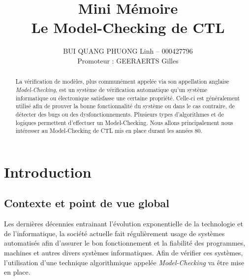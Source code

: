 \documentclass[runningheads,a4paper,10pt]{llncs}
\begin{document}
\mainmatter 

\title{Mini Mémoire \\ Le Model-Checking de CTL}


\author{BUI QUANG PHUONG Linh -- 000427796 \\ Promoteur : GEERAERTS Gilles}



\tocauthor{{}}

\maketitle


\begin{abstract}
La vérification de modèles, plus communément appelée via son appellation anglaise \textit{Model-Checking}, est un système de vérification automatique qu'un système informatique ou électronique satisfasse une certaine propriété. Celle-ci est généralement utilisé afin de prouver la bonne fonctionnalité du système ou dans le cas contraire, de détecter des bugs ou des dysfonctionnements. Plusieurs types d'algorithmes et de logiques permettent d'effectuer un Model-Checking. Nous allons principalement nous intéresser au Model-Checking de CTL mis en place durant les années 80. 
\end{abstract}

\medskip

\begingroup
\let\clearpage\relax
\tableofcontents
\endgroup

\medskip
\medskip

\newpage 

\section{Introduction}

\subsection{Contexte et point de vue global}
\noindent
Les dernières décennies entrainant l'évolution exponentielle de la technologie et de l'informatique, la société actuelle fait régulièrement usage de systèmes automatisés afin d'assurer le bon fonctionnement et la fiabilité des programmes, machines et autres divers systèmes informatiques. Afin de vérifier ces systèmes, l'utilisation d'une technique algorithmique appelée \textit{Model-Checking} va être mise en place.  
\end{document}
